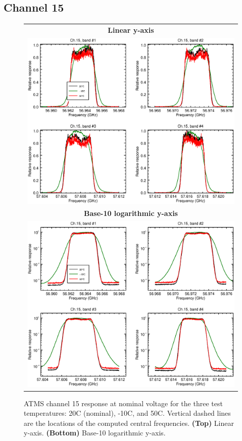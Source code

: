 \subsection{Channel 15}
\begin{figure}[H]
  \label{fig:Tset.ch15_response}
  \centering
  \begin{tabular}{c}
    \hspace{0.75cm}\sffamily\textbf{Linear y-axis} \\
    \includegraphics[scale=0.55]{graphics/srf/Tset/lin/atms_npp-15.eps} \\
    \hspace{0.75cm}\sffamily\textbf{Base-10 logarithmic y-axis} \\
    \includegraphics[scale=0.55]{graphics/srf/Tset/log/atms_npp-15.eps}
  \end{tabular}
  \caption{ATMS channel 15 response at nominal voltage for the three test temperatures: 20\textdegree{}C (nominal), -10\textdegree{}C, and 50\textdegree{}C. Vertical dashed lines are the locations of the computed central frequencies. \textbf{(Top)} Linear y-axis. \textbf{(Bottom)} Base-10 logarithmic y-axis.}
\end{figure}

